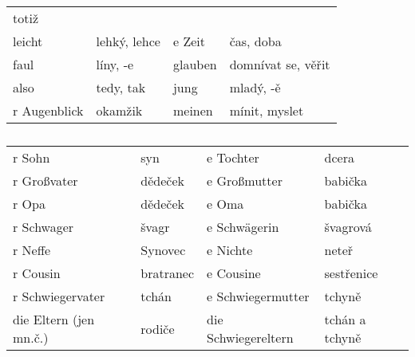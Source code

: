 \begin{widetext}
\begin{tabular}{llll}
          totiž                 \\
          leicht             & lehký, lehce          & e Zeit          & čas, 
          doba             \\
          faul               & líny, -e              & glauben         & domnívat se, 
          věřit    \\
          also               & tedy, tak             & jung            & mladý, 
          -ě             \\
          r Augenblick       & okamžik               & meinen          & mínit, 
          myslet         \\
        \hline
       \end{tabular}
     \end{widetext}
    
    \begin{table}[ht!] %
      \begin{tabular}{llll} 
        \hline 
        r Sohn            & syn        & e Tochter     & dcera        \\
        r Großvater       & dědeček    & e Großmutter  & babička      \\
        r Opa             & dědeček    & e Oma         & babička      \\
        r Schwager        & švagr      & e Schwägerin  & švagrová     \\
        r Neffe           & Synovec    & e Nichte      & neteř        \\
        r Cousin          & bratranec  & e Cousine     & sestřenice   \\
        r Schwiegervater  & tchán & e Schwiegermutter  & tchyně       \\
        die Eltern (jen mn.č.)    & rodiče  & die Schwiegereltern  & tchán a tchyně  \\
        \hline
      \end{tabular}
      \caption*{ }
    \end{table}
    \newpage
